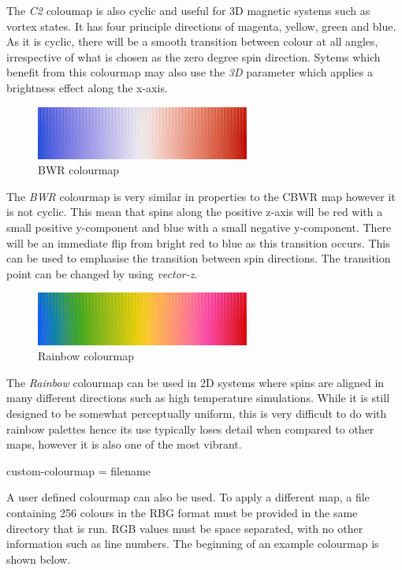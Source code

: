 The \textit{C2} coloumap is also cyclic and useful for 3D magnetic systems such as vortex states. It has four principle directions of magenta, yellow, green and blue. As it is cyclic, there will be a smooth transition between colour at all angles, irrespective of what is chosen as the zero degree spin direction. Sytems which benefit from this colourmap may also use the \textit{3D} parameter which applies a brightness effect along the x-axis.

\vspace{5pt}
\begin{figure}[!h]
\center
\includegraphics[width=7cm]{figures/BWR_colourmap.jpg}
\\ BWR colourmap
\label{fig:BWR_colourmap}
\end{figure}

The \textit{BWR} colourmap is very similar in properties to the CBWR map however it is not cyclic. This mean that spins along the positive z-axis will be red with a small positive y-component and blue with a small negative y-component. There will be an immediate flip from bright red to blue as this transition occurs. This can be used to emphasise the transition between spin directions. The transition point can be changed by using \textit{vector-z}. 

\vspace{5pt}
\begin{figure}[!h]
\center
\includegraphics[width=7cm]{figures/Rainbow_colourmap.jpg}
\\ Rainbow colourmap
\label{fig:Rainbow_colourmap}
\end{figure}

The \textit{Rainbow} colourmap can be used in 2D systems where spins are aligned in many different directions such as high temperature simulations. While it is still designed to be somewhat perceptually uniform, this is very difficult to do with rainbow palettes hence its use typically loses detail when compared to other maps, however it is also one of the most vibrant.

{\zicf custom-colourmap = filename } A user defined colourmap can also be used. To apply a different map, a file containing 256 colours in the RBG format must be provided in the same directory that \vdc is run. RGB values must be space separated, with no other information such as line numbers. The beginning of an example colourmap is shown below. 

